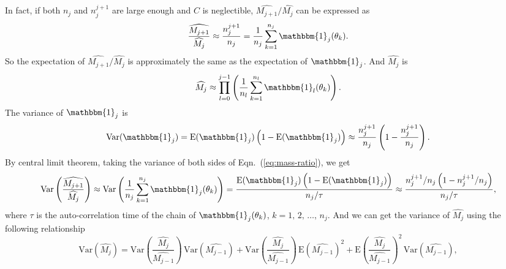 \documentclass[letterpaper, preprint]{aastex}
\begin{document}
In fact, if both $n_{j}$ and $n_{j}^{j+1}$ are large enough and $C$ is neglectible, $\widehat{M_{j+1}}/\widehat{M_{j}}$ can be expressed as
\begin{equation}
\frac{\widehat{M_{j+1}}}{\widehat{M_{j}}}\approx\frac{n_j^{j+1}}{n_j}=\frac{1}{n_j}\sum_{k=1}^{n_j}\mathbbm{1}_j(\theta_k).
\label{eq:mass-ratio}
\end{equation}
So the expectation of $\widehat{M_{j+1}}/\widehat{M_{j}}$ is approximately the same as the expectation of $\mathbbm{1}_j$. And $\widehat{M_j}$ is
\begin{equation}
\widehat{M_j}\approx\prod_{l=0}^{j-1}\left(\frac{1}{n_l}\sum_{k=1}^{n_l}\mathbbm{1}_l(\theta_k)\right).
\end{equation}
The variance of $\mathbbm{1}_j$ is
\begin{equation}
\mathrm{Var}(\mathbbm{1}_j)=\mathrm{E}(\mathbbm{1}_j)\left(1-\mathrm{E}(\mathbbm{1}_j)\right)\approx \frac{n_{j}^{j+1}}{n_{j}}\left(1-\frac{n_{j}^{j+1}}{n_{j}}\right).
\end{equation}
By central limit theorem, taking the variance of both sides of Eqn.~(\ref{eq:mass-ratio}), we get
\begin{eqnarray}
\mathrm{Var}\left(\frac{\widehat{M_{j+1}}}{\widehat{M_{j}}}\right)\approx\mathrm{Var}\left(\frac{1}{n_j}\sum_{k=1}^{n_j}\mathbbm{1}_j(\theta_k)\right) = \frac{\mathrm{E}(\mathbbm{1}_j)\left(1-\mathrm{E}(\mathbbm{1}_j)\right)}{n_{j}/\tau} \approx  \frac{n_{j}^{j+1}/n_{j}\left(1-n_{j}^{j+1}/n_{j}\right)}{n_{j}/\tau},
\label{eq:var-ratio}
\end{eqnarray}
where $\tau$ is the auto-correlation time of the chain of $\mathbbm{1}_j(\theta_k)$, $k=1,\,2,\,\ldots,\,n_j$. And we can get the variance of $\widehat{M_j}$ using the following relationship
\begin{equation}
\mathrm{Var}\left(\widehat{M_{j}}\right)=\mathrm{Var}\left(\frac{\widehat{M_{j}}}{\widehat{M_{j-1}}}\right)\,\mathrm{Var}\left(\widehat{M_{j-1}}\right)+\mathrm{Var}\left(\frac{\widehat{M_{j}}}{\widehat{M_{j-1}}}\right)\,\mathrm{E}\left(\widehat{M_{j-1}}\right)^2+\mathrm{E}\left(\frac{\widehat{M_{j}}}{\widehat{M_{j-1}}}\right)^2\,\mathrm{Var}\left(\widehat{M_{j-1}}\right),
\end{equation}
\end{document}
